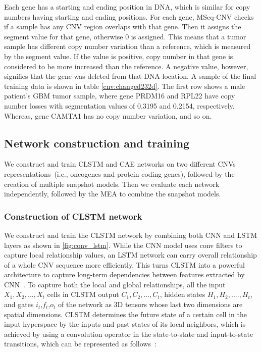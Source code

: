 \hspace*{3.5mm} Each gene has a starting and ending position in DNA, which is similar for copy numbers having starting and ending positions. For each gene, MSeq-CNV checks if a sample has any CNV region overlaps with that gene. Then it assigns the segment value for that gene, otherwise 0 is assigned. This means that a tumor sample has different copy number variation than a reference, which is measured by the segment value. If the value is positive, copy number in that gene is considered to be more increased than the reference. A negative value, however, signifies that the gene was deleted from that DNA location. A sample of the final training data is shown in table \ref{cnv:changed232d}. The first row shows a male patient's GBM tumor sample, where gene PRDM16 and RPL22 have copy number losses with segmentation values of 0.3195 and 0.2154, respectively. Whereas, gene CAMTA1 has no copy number variation, and so on. %

\subsection{Network construction and training}
\label{nc}
We construct and train CLSTM and CAE networks on two different CNVs representations~(i.e., oncogenes and protein-coding genes), followed by the creation of multiple snapshot models. Then we evaluate each network independently, followed by the MEA to combine the snapshot models. 

\subsubsection{Construction of CLSTM network }
We construct and train the CLSTM network by combining both CNN and LSTM layers as shown in \cref{fig:conv_lstm}. While the CNN model uses conv filters to capture local relationship values, an LSTM network can carry overall relationship of a whole CNV sequence more efficiently. This turns CLSTM into a powerful architecture to capture long-term dependencies between features extracted by CNN~\cite{karim2019drug}. To capture both the local and global relationships, all the input ${X}_{1},{X}_{2},...,{X}_{t}$ cells in CLSTM output ${C}_{1},{C}_{2},...,{C}_{t}$, hidden states ${H}_{1},{H}_{2},....,{H}_{t}$, and gates $i_t$,$f_t$,$o_t$ of the network as 3D tensors whose last two dimensions are spatial dimensions. %
CLSTM determines the future state of a certain cell in the input hyperspace by the inputs and past states of its local neighbors, which is achieved by using a convolution operator in the state-to-state and input-to-state transitions, which can be represented as follows~\cite{Conv_LSTM1,karimACCA2019}:

